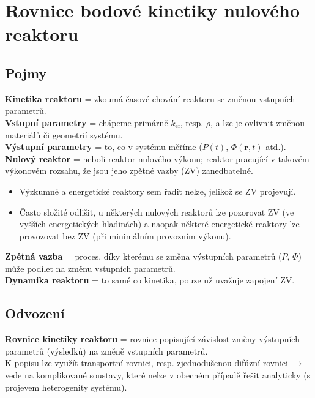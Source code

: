 \section{Rovnice bodové kinetiky nulového reaktoru}

\subsection{Pojmy}

\textbf{Kinetika reaktoru} = zkoumá časové chování reaktoru se změnou vstupních parametrů.\\

\textbf{Vstupní parametry} = chápeme primárně $k_{\text{ef}}$, resp. $\rho$, a lze je ovlivnit změnou materiálů či geometrií systému.\\

\textbf{Výstupní parametry} = to, co v systému měříme ($P(t)$, $\Phi (\textbf{r}, t) $ atd.).\\

\textbf{Nulový reaktor} = neboli reaktor nulového výkonu; reaktor pracující v takovém výkonovém rozsahu, že jsou jeho zpětné vazby (ZV) zanedbatelné.

\begin{itemize}
  \item Výzkumné a energetické reaktory sem řadit nelze, jelikož se ZV projevují.
  \item Často složité odlišit, u některých nulových reaktorů lze pozorovat ZV (ve vyšších energetických hladinách) a naopak některé energetické reaktory lze provozovat bez ZV (při minimálním provozním výkonu).
\end{itemize}

\textbf{Zpětná vazba} = proces, díky kterému se změna výstupních parametrů ($P$, $\Phi$) může podílet na změnu vstupních parametrů.\\

\textbf{Dynamika reaktoru} = to samé co kinetika, pouze už uvažuje zapojení ZV.\\

\subsection{Odvození}

\textbf{Rovnice kinetiky reaktoru} = rovnice popisující závislost změny výstupních parametrů (výsledků) na změně vstupních parametrů.\\

K popisu lze využít transportní rovnici, resp. zjednodušenou difúzní rovnici $\rightarrow$ vede na komplikované soustavy, které nelze v obecném případě řešit analyticky (s projevem heterogenity systému).\\

